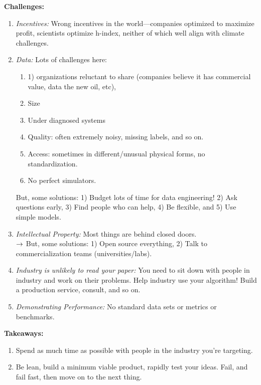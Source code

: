 {\bf Challenges:}
\begin{enumerate}
    \item {\it Incentives:} Wrong incentives in the world---companies optimized to maximize profit, scientists optimize h-index, neither of which well align with climate challenges.
    \item {\it Data:} Lots of challenges here:
    \begin{enumerate}
        \item 1) organizations reluctant to share (companies believe it has commercial value, data the new oil, etc), 
        \item Size
        \item Under diagnosed systems
        \item Quality: often extremely noisy, missing labels, and so on.
        \item Access: sometimes in different/unusual physical forms, no standardization.
        \item No perfect simulators.
    \end{enumerate}
    
    But, some solutions: 1) Budget lots of time for data engineering! 2) Ask questions early, 3) Find people who can help, 4) Be flexible, and 5) Use simple models.
    
    \item {\it Intellectual Property:} Most things are behind closed doors. \\
    
    $\rightarrow$ But, some solutions: 1) Open source everything, 2) Talk to commercialization teams (universities/labs).
    
    \item {\it Industry is unlikely to read your paper:} You need to sit down with people in industry and work on their problems. Help industry use your algorithm! Build a production service, consult, and so on.
    
    \item {\it Demonstrating Performance:} No standard data sets or metrics or benchmarks.

    
\end{enumerate}


{\bf Takeaways:}
\begin{enumerate}
    \item Spend as much time as possible with people in the industry you're targeting.
    \item Be lean, build a minimum viable product, rapidly test your ideas. Fail, and fail fast, then move on to the next thing.
\end{enumerate}

